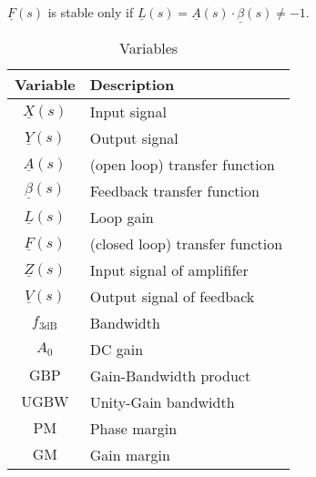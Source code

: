 \documentclass{article}[11pt]
\begin{document}
$\underline{F}(s)$ is stable only if 
$\underline{L}(s) = \underline{A}(s) \cdot \underline{\beta}(s) \neq -1$.


\begin{table}[H]
\centering
\caption{Variables}
\begin{tabular}{cl}
\toprule
\textbf{Variable}       & \textbf{Description}            \\ \midrule
$\underline{X}(s)$      & Input signal                    \\ 
$\underline{Y}(s)$      & Output signal                   \\
$\underline{A}(s)$      & (open loop) transfer function   \\
$\underline{\beta}(s)$  & Feedback transfer function      \\
$\underline{L}(s)$      & Loop gain                       \\
$\underline{F}(s)$      & (closed loop) transfer function \\
$\underline{Z}(s)$      & Input signal of amplififer      \\
$\underline{V}(s)$      & Output signal of feedback       \\
$f_{\mathrm{3dB}}$      & Bandwidth                       \\
$A_{\mathrm{0}}$        & DC gain                         \\
$\mathrm{GBP}$          & Gain-Bandwidth product          \\
$\mathrm{UGBW}$         & Unity-Gain bandwidth            \\
$\mathrm{PM}$           & Phase margin                    \\
$\mathrm{GM}$           & Gain margin                     \\ \toprule
\end{tabular}
\label{tab:variables}
\end{table}
\end{document}
